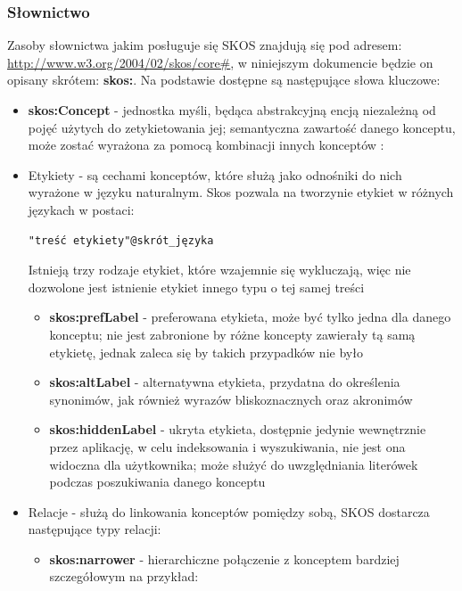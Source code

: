 \documentclass[12pt,a4paper,notitlepage]{article}
\begin{document}
\subsubsection{Słownictwo}
Zasoby słownictwa jakim posługuje się SKOS znajdują się pod adresem:
\url{http://www.w3.org/2004/02/skos/core#}, w niniejszym dokumencie będzie on
opisany skrótem: \textbf{skos:}. Na podstawie \cite{SKOS-pr} dostępne są
następujące słowa kluczowe:
\begin{itemize}
  \item \textbf{skos:Concept} - jednostka myśli, będąca abstrakcyjną encją
    niezależną od pojęć użytych do zetykietowania jej; semantyczna zawartość
    danego konceptu, może zostać wyrażona za pomocą kombinacji innych konceptów
    \cite{Willpower}:
  \item Etykiety - są cechami konceptów, które służą jako odnośniki do nich
    wyrażone w języku naturalnym. Skos pozwala na tworzynie etykiet w różnych
    językach w postaci:
\begin{verbatim}
"treść etykiety"@skrót_języka
\end{verbatim}
    Istnieją trzy rodzaje etykiet, które wzajemnie się wykluczają, więc nie
    dozwolone jest istnienie etykiet innego typu o tej samej treści
    \begin{itemize}
      \item \textbf{skos:prefLabel} - preferowana etykieta, może być tylko
        jedna dla danego konceptu; nie jest zabronione by różne koncepty
        zawierały tą samą etykietę, jednak zaleca się by takich przypadków
        nie było
      \item \textbf{skos:altLabel} - alternatywna etykieta, przydatna do
        określenia synonimów, jak również wyrazów bliskoznacznych oraz
        akronimów
      \item \textbf{skos:hiddenLabel} - ukryta etykieta, dostępnie jedynie
        wewnętrznie przez aplikację, w celu indeksowania i wyszukiwania, nie
        jest ona widoczna dla użytkownika; może służyć do uwzględniania
        literówek podczas poszukiwania danego konceptu
    \end{itemize}
  \item Relacje - służą do linkowania konceptów pomiędzy sobą, SKOS dostarcza
    następujące typy relacji:
    \begin{itemize}
      \item \textbf{skos:narrower} - hierarchiczne połączenie z konceptem
        bardziej szczegółowym na przykład:
\begin{verbatim}

\end{verbatim}
\end{itemize}
\end{itemize}
\end{document}
